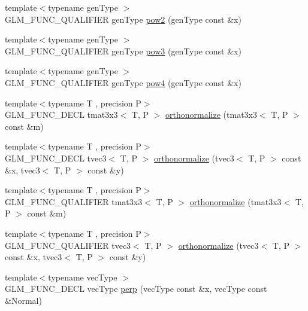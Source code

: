 \begin{DoxyCompactItemize}
\item 
{\footnotesize template$<$typename gen\+Type $>$ }\\G\+L\+M\+\_\+\+F\+U\+N\+C\+\_\+\+Q\+U\+A\+L\+I\+F\+I\+E\+R gen\+Type \hyperlink{group__gtx__optimum__pow_ga19aaff3213bf23bdec3ef124ace237e9}{pow2} (gen\+Type const \&x)
\item 
{\footnotesize template$<$typename gen\+Type $>$ }\\G\+L\+M\+\_\+\+F\+U\+N\+C\+\_\+\+Q\+U\+A\+L\+I\+F\+I\+E\+R gen\+Type \hyperlink{group__gtx__optimum__pow_ga35689d03cd434d6ea819f1942d3bf82e}{pow3} (gen\+Type const \&x)
\item 
{\footnotesize template$<$typename gen\+Type $>$ }\\G\+L\+M\+\_\+\+F\+U\+N\+C\+\_\+\+Q\+U\+A\+L\+I\+F\+I\+E\+R gen\+Type \hyperlink{group__gtx__optimum__pow_gacef0968763026e180e53e735007dbf5a}{pow4} (gen\+Type const \&x)
\item 
{\footnotesize template$<$typename T , precision P$>$ }\\G\+L\+M\+\_\+\+F\+U\+N\+C\+\_\+\+D\+E\+C\+L tmat3x3$<$ T, P $>$ \hyperlink{group__gtx__orthonormalize_ga23c4340b8f1559d259229b6d8bdc3f97}{orthonormalize} (tmat3x3$<$ T, P $>$ const \&m)
\item 
{\footnotesize template$<$typename T , precision P$>$ }\\G\+L\+M\+\_\+\+F\+U\+N\+C\+\_\+\+D\+E\+C\+L tvec3$<$ T, P $>$ \hyperlink{group__gtx__orthonormalize_gad7afff30d7323fdc7aed7f5a16a0c596}{orthonormalize} (tvec3$<$ T, P $>$ const \&x, tvec3$<$ T, P $>$ const \&y)
\item 
{\footnotesize template$<$typename T , precision P$>$ }\\G\+L\+M\+\_\+\+F\+U\+N\+C\+\_\+\+Q\+U\+A\+L\+I\+F\+I\+E\+R tmat3x3$<$ T, P $>$ \hyperlink{group__gtx__orthonormalize_ga23c4340b8f1559d259229b6d8bdc3f97}{orthonormalize} (tmat3x3$<$ T, P $>$ const \&m)
\item 
{\footnotesize template$<$typename T , precision P$>$ }\\G\+L\+M\+\_\+\+F\+U\+N\+C\+\_\+\+Q\+U\+A\+L\+I\+F\+I\+E\+R tvec3$<$ T, P $>$ \hyperlink{group__gtx__orthonormalize_gad7afff30d7323fdc7aed7f5a16a0c596}{orthonormalize} (tvec3$<$ T, P $>$ const \&x, tvec3$<$ T, P $>$ const \&y)
\item 
{\footnotesize template$<$typename vec\+Type $>$ }\\G\+L\+M\+\_\+\+F\+U\+N\+C\+\_\+\+D\+E\+C\+L vec\+Type \hyperlink{group__gtx__perpendicular_ga41f8c73da9798a18e6b1e32f1e301f07}{perp} (vec\+Type const \&x, vec\+Type const \&Normal)

\end{DoxyCompactItemize}
